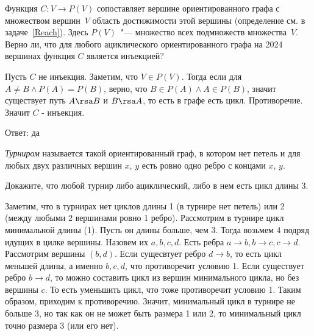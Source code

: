 \documentclass[11pt]{article}
\begin{document}
\p   Функция $C\colon V\to P(V)$ сопоставляет  вершине
ориентированного графа с множеством вершин~$V$ 
область достижимости этой вершины (определение см. в задаче~\ref{Reach}). Здесь $P(V)$~"--- множество всех
подмножеств множества~$V$. Верно ли, что для
любого ациклического ориентированного графа на 2024 вершинах  функция $C$ является инъекцией?

Пусть $C$ не инъекция. Заметим, что $V \in P(V)$. Тогда если для $A \neq B \land P(A) = P(B)$, верно, что $B \in P(A) \land A \in P(B)$, значит существует путь $A \rsa B$ и $B \rsa A$, то есть в графе есть цикл. 
Противоречие. Значит $C$ - инъекция. 

Ответ: да

\p
\emph{Турниром} называется такой ориентированный граф, в котором
нет петель и для любых двух различных вершин $x$, $y$ есть ровно одно
ребро с концами $x$, $y$. 

Докажите, что любой турнир либо ациклический, либо в нем есть цикл длины 3. 

Заметим, что в турнирах нет циклов длины 1 (в турнире нет петель) или 2 (между любыми 2 вершинами ровно 1 ребро). Рассмотрим в турнире цикл минимальной длины (1). Пусть он длины больше, чем 3. Тогда возьмем 4 подряд идущих в цилке вершины. 
Назовем их $a, b, c, d$. Есть ребра $a \to b, b \to c, c \to d$. Рассмотрим вершины $(b, d)$. Если сущесвтует ребро $d \to b$, то есть цикл меньшей длины, а именно $b, c, d$, что противоречит условию 1.
Если существует ребро $b \to d$, то можно составить цикл из вершин минимального цикла, но без вершины $c$. То есть уменьшить цикл, что тоже противоречит условию 1. Таким образом, приходим к противоречию.
Значит, минимальный цикл в турнире не больше 3, но так как он не может быть размера 1 или 2, то минимальный цикл точно размера 3 (или его нет).
\end{document}
